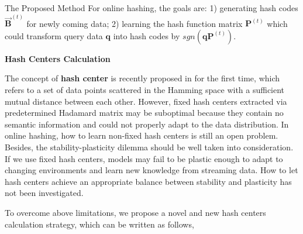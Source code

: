 \documentclass[final]{beamer}
\newlength{\colwidth}
\begin{document}
\begin{frame}[t]
\begin{columns}[t]
\begin{column}{\colwidth}
\begin{block}{The Proposed Method}
					For online hashing, the goals are: 1) generating hash codes  $\vec{\mathbf{B}}^{(t)}  $ for newly coming data; 2) learning the hash function matrix $\mathbf{P}^{(t)}$ which could transform query data $\mathbf{q}$ into hash codes by $ sgn(\mathbf{q}\mathbf{P}^{(t)})$. 
					
					
					\textbf{Hash Centers Calculation}
					
					The concept of \textbf{hash center} is recently proposed in \cite{yuan2020central} for the first time, which refers to a set of data points scattered in the Hamming space with a sufficient mutual distance between each other. However, fixed hash centers extracted via predetermined Hadamard matrix \cite{lin2020hadamard} may be suboptimal  because they contain no semantic information and could not properly adapt to the data distribution. In online hashing, how to learn non-fixed hash centers is still an open problem. Besides, the stability-plasticity dilemma \cite{robins1995catastrophic} should be well taken into consideration. If we use fixed hash centers, models may fail to be plastic enough to adapt to changing environments and learn new knowledge from streaming data. How to let hash centers achieve an appropriate balance between stability and plasticity has not been investigated.
					
					To overcome above limitations, we propose a novel and new hash centers calculation strategy, which can be written as follows,
					

\end{block}
\end{column}
\end{columns}
\end{frame}
\end{document}
